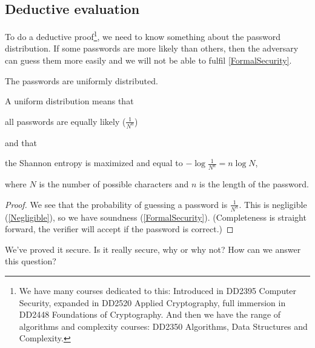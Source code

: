 \subsection{Deductive evaluation}

To do a deductive proof\footnote{%
  We have many courses dedicated to this:
  Introduced in DD2395 Computer Security,
  expanded in DD2520 Applied Cryptography,
  full immersion in DD2448 Foundations of Cryptography.
  And then we have the range of algorithms and complexity courses:
  \eg DD2350 Algorithms, Data Structures and Complexity.
}, we need to know something about the password distribution.
If some passwords are more likely than others, then the adversary can guess 
them more easily and we will not be able to fulfil \cref{FormalSecurity}.

\begin{frame}
  \begin{assumption}\label{AssumeUniform}
    The passwords are uniformly distributed.
  \end{assumption}
\end{frame}

A uniform distribution means that
\begin{frame}
  all passwords are equally likely (\(\frac{1}{N^n}\))
\end{frame}
and that
\begin{frame}
  the Shannon entropy is maximized and equal to \(-\log \frac{1}{N^n} = n \log 
  {N}\),
\end{frame}
where \(N\) is the number of possible characters and \(n\) is the length of the 
password.

\begin{frame}
  \begin{proof}
    We see that the probability of guessing a password is \(\frac{1}{N^n}\).
    This is negligible (\cref{Negligible}), so we have soundness 
    (\cref{FormalSecurity}).
    (Completeness is straight forward, the verifier will accept if the password 
    is correct.)
  \end{proof}
\end{frame}

\begin{frame}
  \begin{exercise}
    We've proved it secure.
    Is it really secure, why or why not?
    How can we answer this question?
  \end{exercise}

\end{frame}

